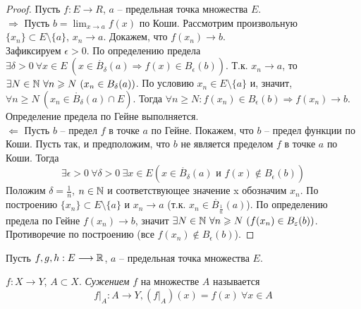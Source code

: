     \begin{proof}
        Пусть $f: E \longrightarrow R$, $a$ -- предельная точка множества $E$.
        \\
        $\Rightarrow$ Пусть $b = \lim_{x \rightarrow a} f(x)$ по Коши.
        Рассмотрим произвольную $\{x_{n}\} \subset E \setminus \{a\}$, $x_{n} \rightarrow a$. Докажем, что $f(x_{n}) \rightarrow b$.
        \\
        Зафиксируем $\epsilon > 0$. По определению предела $\exists \delta > 0 \ \forall x \in E \ (x \in \mathring{B_{\delta}}(a) \Rightarrow f(x) \in \overset{}{B_{\epsilon}}(b))$. Т.к. $x_{n} \rightarrow a$, то $\exists N \in \N \ \forall n \geq N \ (x_{n} \in \overset{}{B_{\delta}}(a))$. По условию $x_{n} \in E \setminus \{a\}$ и, значит, $\forall n \geq N \ (x_{n} \in \mathring{B_{\delta}}(a) \cap E)$. Тогда $\forall n \geq N: f(x_{n}) \in \overset{}{B_{\epsilon}}(b) \Rightarrow f(x_{n}) \rightarrow b$. Определение предела по Гейне выполняется. 
        \\
        $\Leftarrow$ Пусть $b$ -- предел $f$ в точке $a$ по Гейне. Покажем, что $b$ -- предел функции по Коши. Пусть так, и предположим, что $b$ не является пределом $f$ в точке $a$ по Коши. Тогда 
        \[\exists \epsilon > 0 \ \forall \delta > 0 \ \exists x \in E (x \in \mathring{B_{\delta}}(a) \text{ и } f(x) \notin \overset{}{B_{\epsilon}}(b))\]
        Положим $\delta = \frac{1}{n}$, $n \in \mathbb{N}$ и соответствующее значение x обозначим $x_{n}$. По построению $\{x_{n}\} \subset E \setminus \{a\}$ и $x_{n} \rightarrow a$ (т.к. $x_{n} \in \mathring{B_{\frac{1}{n}}}(a)$). По определению предела по Гейне $f(x_{n}) \rightarrow b$, значит $\exists N \in \N \ \forall n \geq N \ (f(x_{n}) \in \overset{}{B_{\epsilon}}(b))$. Противоречие по построению (все $f(x_{n}) \notin \overset{}{B_{\epsilon}}(b)$).
    \end{proof}

    Пусть $f,g,h: E \longrightarrow \mathbb{R}$, $a$ -- предельная точка множества $E$.

    \begin{definition}
        $f: X \longrightarrow Y$, $A \subset X$. \textit{Сужением} $f$ на множестве $A$ называется
        \[f|_{A}: A \longrightarrow Y, (f|_{A})(x) = f(x) \ \forall x \in A\]
    \end{definition}
    
